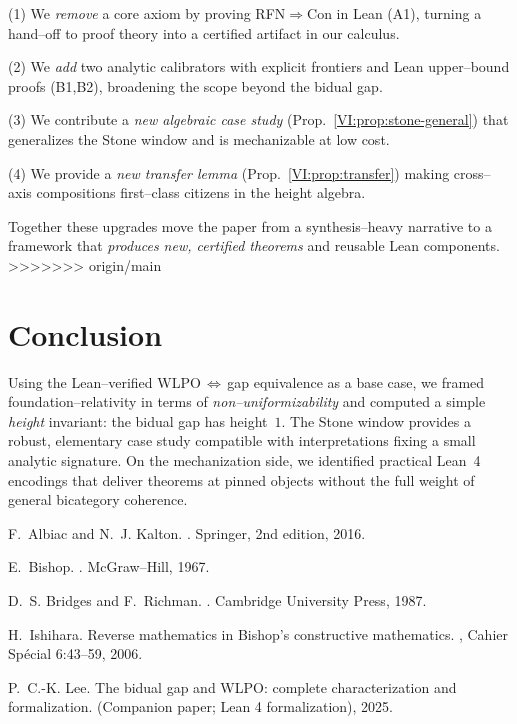 \documentclass[11pt]{article}
\theoremstyle{definition}
\theoremstyle{remark}
\begin{document}
(1) We \emph{remove} a core axiom by proving RFN\(\Rightarrow\)Con in Lean (A1), turning a hand–off to proof theory into a certified artifact in our calculus.

(2) We \emph{add} two analytic calibrators with explicit frontiers and Lean upper–bound proofs (B1,B2), broadening the scope beyond the bidual gap.

(3) We contribute a \emph{new algebraic case study} (Prop.~\ref{VI:prop:stone-general}) that generalizes the Stone window and is mechanizable at low cost.

(4) We provide a \emph{new transfer lemma} (Prop.~\ref{VI:prop:transfer}) making cross–axis compositions first–class citizens in the height algebra.

Together these upgrades move the paper from a synthesis–heavy narrative to a framework that \emph{produces new, certified theorems} and reusable Lean components.
>>>>>>> origin/main










\section{Conclusion}

Using the Lean–verified WLPO\,$\Leftrightarrow$\,gap equivalence as a base case, we framed foundation--relativity in terms of \emph{non--uniformizability} and computed a simple \emph{height} invariant: the bidual gap has height~$1$. The Stone window provides a robust, elementary case study compatible with interpretations fixing a small analytic signature. On the mechanization side, we identified practical Lean~4 encodings that deliver theorems at pinned objects without the full weight of general bicategory coherence. 

\bigskip


\begin{thebibliography}{10}

F.~Albiac and N.~J. Kalton.
.
\newblock Springer, 2nd edition, 2016.

E.~Bishop.
.
\newblock McGraw--Hill, 1967.

D.~S. Bridges and F.~Richman.
.
\newblock Cambridge University Press, 1987.

H.~Ishihara.
\newblock Reverse mathematics in {B}ishop's constructive mathematics.
, Cahier Sp\'ecial 6:43--59, 2006.

P.~C.-K. Lee.
\newblock The bidual gap and {WLPO}: complete characterization and
  formalization.
\newblock (Companion paper; Lean 4 formalization), 2025.

\end{thebibliography}
\end{document}
